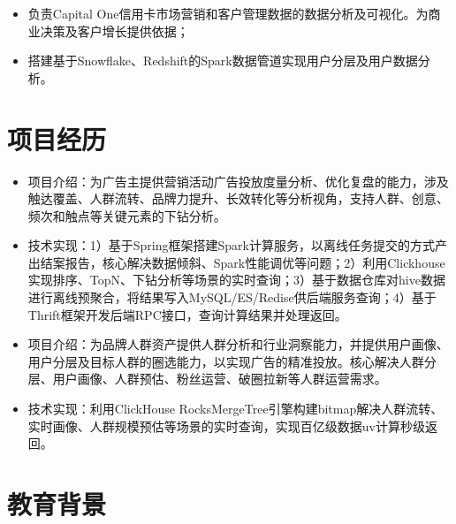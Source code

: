 \documentclass{resume}
\begin{document}
\begin{itemize}
  \item 负责Capital One信用卡市场营销和客户管理数据的数据分析及可视化。为商业决策及客户增长提供依据；
  \item 搭建基于Snowflake、Redshift的Spark数据管道实现用户分层及用户数据分析。
\end{itemize}

\section{项目经历}
\begin{itemize}
  \item 项目介绍：为广告主提供营销活动广告投放度量分析、优化复盘的能力，涉及触达覆盖、人群流转、品牌力提升、长效转化等分析视角，支持人群、创意、频次和触点等关键元素的下钻分析。
  \item 技术实现：1）基于Spring框架搭建Spark计算服务，以离线任务提交的方式产出结案报告，核心解决数据倾斜、Spark性能调优等问题；2）利用Clickhouse实现排序、TopN、下钻分析等场景的实时查询；3）基于数据仓库对hive数据进行离线预聚合，将结果写入MySQL/ES/Redise供后端服务查询；4）基于Thrift框架开发后端RPC接口，查询计算结果并处理返回。
\end{itemize}

\begin{itemize}
  \item 项目介绍：为品牌人群资产提供人群分析和行业洞察能力，并提供用户画像、用户分层及目标人群的圈选能力，以实现广告的精准投放。核心解决人群分层、用户画像、人群预估、粉丝运营、破圈拉新等人群运营需求。
  \item 技术实现：利用ClickHouse RocksMergeTree引擎构建bitmap解决人群流转、实时画像、人群规模预估等场景的实时查询，实现百亿级数据uv计算秒级返回。
\end{itemize}

\section{教育背景}
\end{document}
